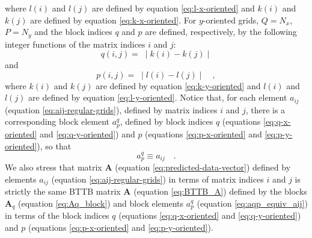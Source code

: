 \documentclass[manuscript,revised]{geophysics}
\begin{document}
where $l(i)$ and $l(j)$ are defined by equation \ref{eq:l-x-oriented} 
and $k(i)$ and $k(j)$ are defined by equation \ref{eq:k-x-oriented}.
For $y$-oriented grids, $Q = N_{x}$, $P = N_{y}$ and the block indices
$q$ and $p$ are defined, respectively, by the following integer functions 
of the matrix indices $i$ and $j$:
\begin{equation}
q(i, j) = \; \mid k(i) - k(j) \mid 
\label{eq:q-y-oriented}
\end{equation}
and
\begin{equation}
p(i, j) = \; \mid l(i) - l(j) \mid \quad ,
\label{eq:p-y-oriented}
\end{equation}
where $k(i)$ and $k(j)$ are defined by equation \ref{eq:k-y-oriented}
and $l(i)$ and $l(j)$ are defined by equation \ref{eq:l-y-oriented}.
Notice that, for each element $a_{ij}$ (equation \ref{eq:aij-regular-grids}),
defined by matrix indices $i$ and $j$, there is a corresponding block element
$a^{q}_{p}$, defined by block indices $q$ (equations \ref{eq:q-x-oriented} and 
\ref{eq:q-y-oriented}) and $p$ (equations \ref{eq:p-x-oriented} and \ref{eq:p-y-oriented}),
so that
\begin{equation}
	a^{q}_{p} \equiv a_{ij} \quad .
	\label{eq:aqp_equiv_aij}
\end{equation}
We also stress that matrix $\mathbf{A}$ (equation \ref{eq:predicted-data-vector}) defined 
by elements $a_{ij}$ (equation \ref{eq:aij-regular-grids}) in terms of matrix indices 
$i$ and $j$ is strictly the same BTTB matrix $\mathbf{A}$ (equation \ref{eq:BTTB_A}) defined 
by the blocks $\mathbf{A}_{q}$ (equation \ref{eq:Aq_block}) and block elements 
$a^{q}_{p}$ (equation \ref{eq:aqp_equiv_aij}) in terms of the block indices 
$q$ (equations \ref{eq:q-x-oriented} and \ref{eq:q-y-oriented}) and $p$ 
(equations \ref{eq:p-x-oriented} and \ref{eq:p-y-oriented}).
\end{document}
